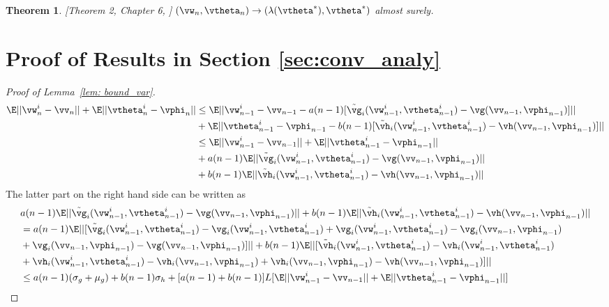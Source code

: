 \documentclass{article}
\newtheorem{theorem}{Theorem}
\def\lemref#1{Lemma~\ref{#1}}
\begin{document}
	\begin{theorem}
	\label{thm: two_time}
		[Theorem 2, Chapter 6, \citep{borkar2009stochastic}] $(\vw_n,\vtheta_n)\rightarrow (\lambda(\vtheta^*), \vtheta^*)$  almost surely.
	\end{theorem}
	

\section{Proof of Results in Section \ref{sec:conv_analy}}\label{app: proof}
\begin{proof}	[Proof of \lemref{lem: bound_var}]
		\begin{equation}
		\label{eq: lem1_1}
		\begin{split}
		\E ||\vw^i_n-\vv_n||+\E||\vtheta^i_n-\vphi_n||&\leq \E||\vw^i_{n-1}-\vv_{n-1}-a(n-1)[\tilde{\vg}_i(\vw^i_{n-1}, \vtheta^i_{n-1})-\vg(\vv_{n-1}, \vphi_{n-1})]||\\
		& + \E||\vtheta^i_{n-1}-\vphi_{n-1}-b(n-1)[\tilde{\vh}_i(\vw^i_{n-1}, \vtheta^i_{n-1})-\vh(\vv_{n-1}, \vphi_{n-1})]||\\
		&\leq \E||\vw^i_{n-1}-\vv_{n-1}|| + \E||\vtheta^i_{n-1}-\vphi_{n-1}||\\
		&+a(n-1)\E||\tilde{\vg}_i(\vw^i_{n-1}, \vtheta^i_{n-1})-\vg(\vv_{n-1},\vphi_{n-1})||\\
		&+b(n-1)\E||\tilde{\vh}_i(\vw^i_{n-1}, \vtheta^i_{n-1})-\vh(\vv_{n-1},\vphi_{n-1})||
		\end{split}
		\end{equation}	
		The latter part on the right hand side can be written as
		\begin{equation}
		\label{eq: lem1_2}
		\begin{split}
		&a(n-1)\E||\tilde{\vg}_i(\vw^i_{n-1}, \vtheta^i_{n-1})-\vg(\vv_{n-1},\vphi_{n-1})||
		+b(n-1)\E||\tilde{\vh}_i(\vw^i_{n-1}, \vtheta^i_{n-1})-\vh(\vv_{n-1},\vphi_{n-1})||\\
		&=a(n-1)\E||[\tilde{\vg}_i(\vw^i_{n-1}, \vtheta^i_{n-1})-\vg_i(\vw^i_{n-1}, \vtheta^i_{n-1})+\vg_i(\vw^i_{n-1}, \vtheta^i_{n-1})-\vg_i(\vv_{n-1},\vphi_{n-1})\\
		&+\vg_i(\vv_{n-1},\vphi_{n-1})-\vg(\vv_{n-1},\vphi_{n-1})]||+b(n-1)\E||[\tilde{\vh}_i(\vw^i_{n-1}, \vtheta^i_{n-1})-\vh_i(\vw^i_{n-1}, \vtheta^i_{n-1})\\
		&+\vh_i(\vw^i_{n-1}, \vtheta^i_{n-1})-\vh_i(\vv_{n-1},\vphi_{n-1})+\vh_i(\vv_{n-1},\vphi_{n-1})-\vh(\vv_{n-1},\vphi_{n-1})]||\\
		&\leq a(n-1)(\sigma_g+\mu_g)+b(n-1)\sigma_h + [a(n-1)+b(n-1)]L[\E||\vw^i_{n-1}-\vv_{n-1}||+\E||\vtheta^i_{n-1}-\vphi_{n-1}||]\\

\end{split}
\end{equation}
\end{proof}
\end{document}

